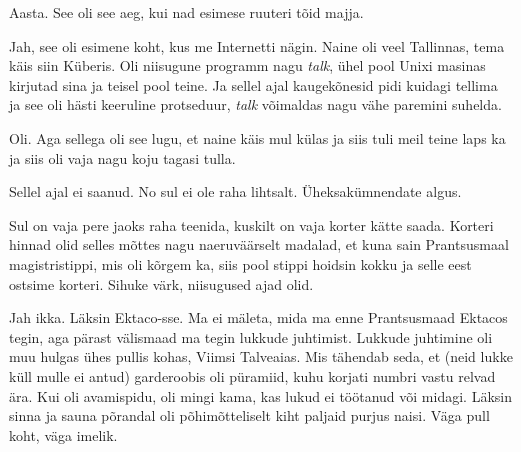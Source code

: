 
Aasta. See oli see aeg, kui nad esimese ruuteri tõid majja.


Jah, see oli esimene koht, kus me Internetti nägin. Naine oli veel Tallinnas, 
tema käis siin Küberis. Oli niisugune programm nagu \emph{talk}, 
ühel pool Unixi masinas kirjutad sina ja teisel pool teine. Ja sellel ajal
kaugekõnesid pidi kuidagi tellima ja see oli hästi keeruline protseduur,  
\emph{talk} võimaldas nagu vähe paremini suhelda.

          
Oli. Aga sellega oli see lugu, et naine käis mul külas ja siis tuli meil teine 
laps ka ja siis oli vaja nagu koju tagasi tulla.
                 

Sellel ajal ei saanud. No sul ei ole raha lihtsalt. Üheksakümnendate algus.

Sul on vaja pere jaoks raha teenida, kuskilt on vaja korter kätte saada. 
Korteri hinnad olid selles mõttes nagu naeruväärselt madalad, et kuna sain 
Prantsusmaal magistristippi, mis oli kõrgem ka, siis pool stippi hoidsin kokku 
ja selle eest ostsime korteri. Sihuke värk, niisugused ajad olid. 


Jah ikka. Läksin Ektaco-sse. Ma ei mäleta, mida ma enne 
Prantsusmaad Ektacos tegin, aga pärast välismaad ma tegin lukkude juhtimist. 
Lukkude juhtimine oli muu hulgas ühes pullis kohas, Viimsi 
Talveaias. Mis tähendab seda, et (neid 
lukke küll mulle ei antud) garderoobis oli püramiid, kuhu korjati numbri vastu 
relvad ära. Kui oli avamispidu, oli mingi kama, kas lukud ei töötanud või 
midagi. Läksin sinna ja sauna põrandal oli põhimõtteliselt kiht paljaid purjus 
naisi. Väga pull koht, väga imelik.
 
